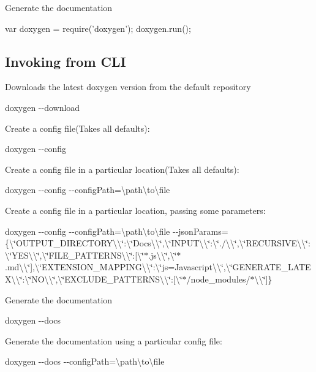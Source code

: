 Generate the documentation


\begin{DoxyCode}
var doxygen = require('doxygen');
doxygen.run();
\end{DoxyCode}


\subsection*{Invoking from C\+LI}

Downloads the latest doxygen version from the default repository

{\ttfamily doxygen -\/-\/download}

Create a config file(\+Takes all defaults)\+:

{\ttfamily doxygen -\/-\/config}

Create a config file in a particular location(\+Takes all defaults)\+:

{\ttfamily doxygen -\/-\/config -\/-\/config\+Path=\textbackslash{}path\textbackslash{}to\textbackslash{}file}

Create a config file in a particular location, passing some parameters\+:

{\ttfamily doxygen -\/-\/config -\/-\/config\+Path=\textbackslash{}path\textbackslash{}to\textbackslash{}file -\/-\/json\+Params=\{\textbackslash{}\char`\"{}\+O\+U\+T\+P\+U\+T\+\_\+\+D\+I\+R\+E\+C\+T\+O\+R\+Y\textbackslash{}\textbackslash{}\char`\"{}\+:\textbackslash{}\char`\"{}\+Docs\textbackslash{}\textbackslash{}\char`\"{},\textbackslash{}\char`\"{}\+I\+N\+P\+U\+T\textbackslash{}\textbackslash{}\char`\"{}\+:\textbackslash{}\char`\"{}./\textbackslash{}\textbackslash{}\char`\"{},\textbackslash{}\char`\"{}\+R\+E\+C\+U\+R\+S\+I\+V\+E\textbackslash{}\textbackslash{}\char`\"{}\+:\textbackslash{}\char`\"{}\+Y\+E\+S\textbackslash{}\textbackslash{}\char`\"{},\textbackslash{}\char`\"{}\+F\+I\+L\+E\+\_\+\+P\+A\+T\+T\+E\+R\+N\+S\textbackslash{}\textbackslash{}\char`\"{}\+:\mbox{[}\textbackslash{}\char`\"{}$\ast$.\+js\textbackslash{}\textbackslash{}\char`\"{},\textbackslash{}\char`\"{}$\ast$.\+md\textbackslash{}\textbackslash{}\char`\"{}\mbox{]},\textbackslash{}\char`\"{}\+E\+X\+T\+E\+N\+S\+I\+O\+N\+\_\+\+M\+A\+P\+P\+I\+N\+G\textbackslash{}\textbackslash{}\char`\"{}\+:\textbackslash{}\char`\"{}js=\+Javascript\textbackslash{}\textbackslash{}\char`\"{},\textbackslash{}\char`\"{}\+G\+E\+N\+E\+R\+A\+T\+E\+\_\+\+L\+A\+T\+E\+X\textbackslash{}\textbackslash{}\char`\"{}\+:\textbackslash{}\char`\"{}\+N\+O\textbackslash{}\textbackslash{}\char`\"{},\textbackslash{}\char`\"{}\+E\+X\+C\+L\+U\+D\+E\+\_\+\+P\+A\+T\+T\+E\+R\+N\+S\textbackslash{}\textbackslash{}\char`\"{}\+:\mbox{[}\textbackslash{}\char`\"{}$\ast$/node\+\_\+modules/$\ast$\textbackslash{}\textbackslash{}\char`\"{}\mbox{]}\}}

Generate the documentation

{\ttfamily doxygen -\/-\/docs}

Generate the documentation using a particular config file\+:

{\ttfamily doxygen -\/-\/docs -\/-\/config\+Path=\textbackslash{}path\textbackslash{}to\textbackslash{}file} 